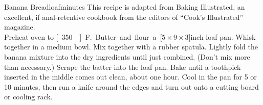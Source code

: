 \begin{recipe}{Banana Bread}{\unit[1]{loaf}}{\unit[90]{minutes}}
\freeform This recipe is adapted from Baking Illustrated, an excellent, if anal-retentive cookbook from the editors of ``Cook's Illustrated'' magazine.\\
\newstep Preheat oven to \unit[350\0]{F.} Butter and flour a \unit[$5\times 9\times 3$]{inch} loaf pan.
Whisk together in a medium bowl.
Mix together with a rubber spatula. Lightly fold the banana mixture
into the dry ingredients until just combined. (Don't mix more than
necessary.) Scrape the batter into the loaf pan. Bake until a toothpick
inserted in the middle comes out clean, about one hour. Cool in the
pan for 5 or 10 minutes, then run a knife around the edges and turn
out onto a cutting board or cooling rack.
\end{recipe}
